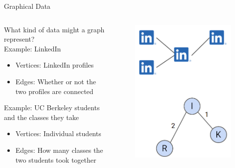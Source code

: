 \documentclass[aspectratio=169]{../latex_main/tntbeamer}  %
\begin{document}
	
	\begin{frame}{Graphical Data}
	    \begin{columns}
            \begin{column}{.5\textwidth}
                    What kind of data might a graph represent?
                    \\\bigskip
                    Example: LinkedIn
                    \begin{itemize}
                        \item Vertices: LinkedIn profiles
                        \item Edges: Whether or not the two profiles are connected
                    \end{itemize}
                    \bigskip
                    Example: UC Berkeley students and the classes they take
                    \begin{itemize}
                        \item Vertices: Individual students
                        \item Edges: How many classes the two students took together
                    \end{itemize}
            \end{column}
            
            
            \begin{column}{.5\textwidth}
                    \begin{figure}
                        \centering
                        \includegraphics[scale=.35]{Bild7}
                    \end{figure}
            \end{column}
        \end{columns}
	\end{frame}
	
\end{document}
